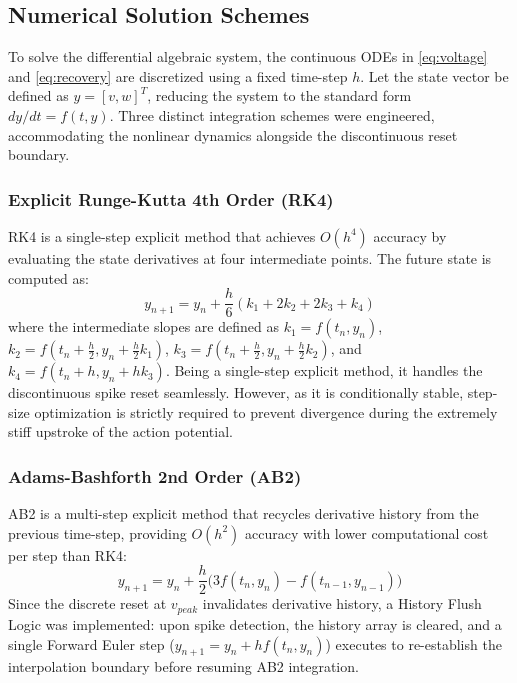 \documentclass[conference]{IEEEtran}
\begin{document}
\subsection{Numerical Solution Schemes}

To solve the differential algebraic system, the continuous ODEs in \eqref{eq:voltage} and \eqref{eq:recovery} are discretized using a fixed time-step $h$. Let the state vector be defined as $y = [v, w]^T$, reducing the system to the standard form $dy/dt = f(t, y)$. Three distinct integration schemes were engineered, accommodating the nonlinear dynamics alongside the discontinuous reset boundary.

\subsubsection{Explicit Runge-Kutta 4th Order (RK4)}
RK4 is a single-step explicit method that achieves $O(h^4)$ accuracy by evaluating the state derivatives at four intermediate points. The future state is computed as:
\begin{equation}
    y_{n+1} = y_n + \frac{h}{6}(k_1 + 2k_2 + 2k_3 + k_4)
\end{equation}
where the intermediate slopes are defined as $k_1 = f(t_n, y_n)$, $k_2 = f(t_n + \frac{h}{2}, y_n + \frac{h}{2}k_1)$, $k_3 = f(t_n + \frac{h}{2}, y_n + \frac{h}{2}k_2)$, and $k_4 = f(t_n + h, y_n + h k_3)$. Being a single-step explicit method, it handles the discontinuous spike reset seamlessly. However, as it is conditionally stable, step-size optimization is strictly required to prevent divergence during the extremely stiff upstroke of the action potential.

\subsubsection{Adams-Bashforth 2nd Order (AB2)}
AB2 is a multi-step explicit method that recycles derivative history from the previous time-step, providing $O(h^2)$ accuracy with lower computational cost per step than RK4:
\begin{equation}
    y_{n+1} = y_n + \frac{h}{2}\bigl(3f(t_n, y_n) - f(t_{n-1}, y_{n-1})\bigr)
\end{equation}
Since the discrete reset at $v_{peak}$ invalidates derivative history, a History Flush Logic was implemented: upon spike detection, the history array is cleared, and a single Forward Euler step ($y_{n+1} = y_n + h f(t_n, y_n)$) executes to re-establish the interpolation boundary before resuming AB2 integration.
\end{document}
